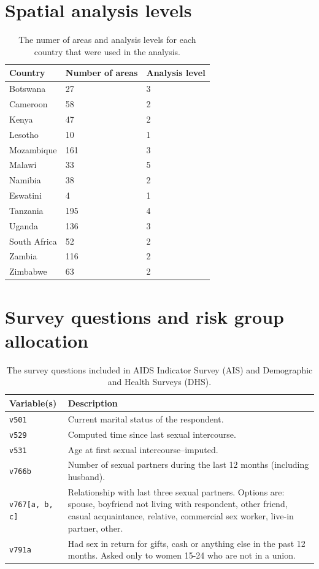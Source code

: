 \documentclass[a4paper, nobind]{templates/ociamthesis}
\begin{document}
\hypertarget{spatial-analysis-levels}{%
\section{Spatial analysis levels}\label{spatial-analysis-levels}}

\begin{table}[h]
\centering
\begin{tabularx}{\textwidth}{lXX}
\toprule
Country & Number of areas & Analysis level \\ 
\midrule
Botswana & 27 & 3 \\ 
Cameroon & 58 & 2 \\ 
Kenya & 47 & 2 \\ 
Lesotho & 10 & 1 \\ 
Mozambique & 161 & 3 \\ 
Malawi & 33 & 5 \\ 
Namibia & 38 & 2 \\ 
Eswatini & 4 & 1 \\ 
Tanzania & 195 & 4 \\ 
Uganda & 136 & 3 \\ 
South Africa & 52 & 2 \\ 
Zambia & 116 & 2 \\ 
Zimbabwe & 63 & 2 \\ 
\bottomrule
\end{tabularx}
\label{tab:area-levels}
\caption{The numer of areas and analysis levels for each country that were used in the analysis.}
\end{table}

\hypertarget{survey-questions}{%
\section{Survey questions and risk group allocation}\label{survey-questions}}

\begin{table}[h]
\centering
\begin{tabularx}{\textwidth}{lX}
\toprule
Variable(s) & Description \\
\midrule
\texttt{v501} & Current marital status of the respondent. \\
\texttt{v529} & Computed time since last sexual intercourse. \\
\texttt{v531} & Age at first sexual intercourse--imputed. \\
\texttt{v766b} & Number of sexual partners during the last 12 months (including husband). \\
\texttt{v767[a, b, c]} & Relationship with last three sexual partners. Options are: spouse, boyfriend not living with respondent, other friend, casual acquaintance, relative, commercial sex worker, live-in partner, other. \\
\texttt{v791a} & Had sex in return for gifts, cash or anything else in the past 12 months. Asked only to women 15-24 who are not in a union. \\
\bottomrule
\end{tabularx}
\caption{The survey questions included in AIDS Indicator Survey (AIS) and Demographic and Health Surveys (DHS).}
\end{table}
\end{document}

